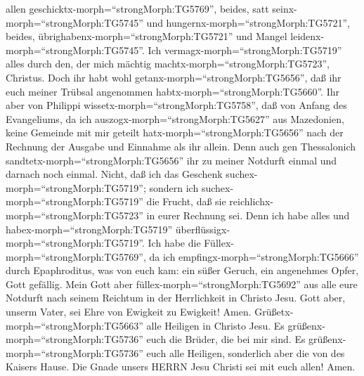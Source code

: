 allen geschicktx-morph=``strongMorph:TG5769'', beides, satt
seinx-morph=``strongMorph:TG5745'' und
hungernx-morph=``strongMorph:TG5721'', beides,
übrighabenx-morph=``strongMorph:TG5721'' und Mangel
leidenx-morph=``strongMorph:TG5745''.  Ich
vermagx-morph=``strongMorph:TG5719'' alles durch den, der mich mächtig
machtx-morph=``strongMorph:TG5723'', Christus.  Doch ihr
habt wohl getanx-morph=``strongMorph:TG5656'', daß ihr euch meiner
Trübsal angenommen habtx-morph=``strongMorph:TG5660''.  Ihr
aber von Philippi wissetx-morph=``strongMorph:TG5758'', daß von Anfang
des Evangeliums, da ich auszogx-morph=``strongMorph:TG5627'' aus
Mazedonien, keine Gemeinde mit mir geteilt
hatx-morph=``strongMorph:TG5656'' nach der Rechnung der Ausgabe und
Einnahme als ihr allein.  Denn auch gen Thessalonich
sandtetx-morph=``strongMorph:TG5656'' ihr zu meiner Notdurft einmal und
darnach noch einmal.  Nicht, daß ich das Geschenk
suchex-morph=``strongMorph:TG5719''; sondern ich
suchex-morph=``strongMorph:TG5719'' die Frucht, daß sie
reichlichx-morph=``strongMorph:TG5723'' in eurer Rechnung sei.
 Denn ich habe alles und habex-morph=``strongMorph:TG5719''
überflüssigx-morph=``strongMorph:TG5719''. Ich habe die
Füllex-morph=``strongMorph:TG5769'', da ich
empfingx-morph=``strongMorph:TG5666'' durch Epaphroditus, was von euch
kam: ein süßer Geruch, ein angenehmes Opfer, Gott gefällig.
 Mein Gott aber füllex-morph=``strongMorph:TG5692'' aus
alle eure Notdurft nach seinem Reichtum in der Herrlichkeit in Christo
Jesu.  Gott aber, unserm Vater, sei Ehre von Ewigkeit zu
Ewigkeit! Amen.  Grüßetx-morph=``strongMorph:TG5663'' alle
Heiligen in Christo Jesu. Es grüßenx-morph=``strongMorph:TG5736'' euch
die Brüder, die bei mir sind.  Es
grüßenx-morph=``strongMorph:TG5736'' euch alle Heiligen, sonderlich aber
die von des Kaisers Hause.  Die Gnade unsers HERRN Jesu
Christi sei mit euch allen! Amen.
